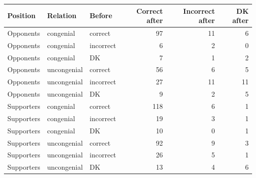 \begin{tabular}{lllrrr}
\toprule
Position & Relation & Before & Correct after & Incorrect after & DK after \\
\midrule
Opponents & congenial & correct & 97 & 11 & 6 \\
Opponents & congenial & incorrect & 6 & 2 & 0 \\
Opponents & congenial & DK & 7 & 1 & 2 \\
Opponents & uncongenial & correct & 56 & 6 & 5 \\
Opponents & uncongenial & incorrect & 27 & 11 & 11 \\
Opponents & uncongenial & DK & 9 & 2 & 5 \\
Supporters & congenial & correct & 118 & 6 & 1 \\
Supporters & congenial & incorrect & 19 & 3 & 1 \\
Supporters & congenial & DK & 10 & 0 & 1 \\
Supporters & uncongenial & correct & 92 & 9 & 3 \\
Supporters & uncongenial & incorrect & 26 & 5 & 1 \\
Supporters & uncongenial & DK & 13 & 4 & 6 \\
\bottomrule
\end{tabular}
